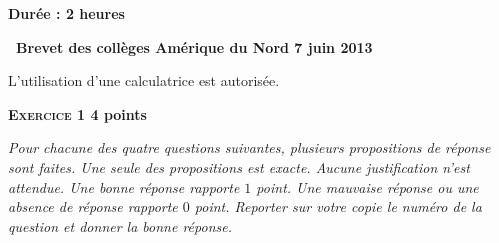 \documentclass[10pt]{article}
\begin{document}
\setlength\parindent{0mm}
\renewcommand \footrulewidth{.2pt}
\pagestyle{fancy}
\thispagestyle{empty}
\begin{center}
\textbf{Durée : 2 heures}

\vspace{0,25cm}

{\Large \textbf{\decofourleft~Brevet des collèges Amérique du Nord 7 juin 2013~\decofourright}}

\vspace{0,25cm}

L'utilisation d'une calculatrice est autorisée.

\end{center}
 
\vspace{0,25cm}

\textbf{\textsc{Exercice 1} \hfill 4 points}

\medskip

\emph{Pour chacune des quatre questions suivantes, plusieurs propositions de réponse sont faites. Une seule des propositions est exacte. Aucune justification n'est attendue. Une bonne réponse rapporte $1$ point. Une mauvaise réponse ou une absence de réponse rapporte $0$ point. Reporter sur votre copie le numéro de la question et donner la bonne réponse.}

\medskip
 
\end{document}
